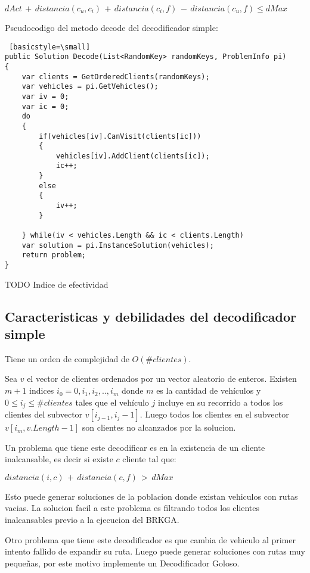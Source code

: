 \bigskip

\( dAct\, +\, distancia(c_u, c_i)\, +\, distancia(c_i, f)\, -\, distancia(c_u, f) \leq dMax\)

\bigskip

Pseudocodigo del metodo decode del decodificador simple:

\bigskip

\begin{lstlisting} [basicstyle=\small]
public Solution Decode(List<RandomKey> randomKeys, ProblemInfo pi)
{
	var clients = GetOrderedClients(randomKeys);
	var vehicles = pi.GetVehicles();	
	var iv = 0;
	var ic = 0;	
	do
	{
		if(vehicles[iv].CanVisit(clients[ic]))
		{
			vehicles[iv].AddClient(clients[ic]);
			ic++;
		}
		else
		{
			iv++;			
		}
		
	} while(iv < vehicles.Length && ic < clients.Length)	
	var solution = pi.InstanceSolution(vehicles);
	return problem;
}
\end{lstlisting}

TODO Indice de efectividad

\subsection{Caracteristicas y debilidades del decodificador simple}

Tiene un orden de complejidad de $O(\#clientes)$.

\bigskip

Sea $v$ el vector de clientes ordenados por un vector aleatorio de enteros. Existen $m+1$ indices $i_0 = 0, i_1, i_2, .., i_m$ donde $m$ es la cantidad de vehículos y $0 \leq i_j \leq \#clientes$ tales que el vehículo $j$ incluye en su recorrido a todos los clientes del subvector $v[i_{j-1}, i_j-1]$. Luego todos los clientes en el subvector $v[i_m, v.Length - 1]$ son clientes no alcanzados por la solucion.

\bigskip

Un problema que tiene este decodificar es en la existencia de un cliente inalcansable, es decir si existe $c$ cliente tal que:

\( distancia(i, c)\, +\, distancia(c, f)\, >\, dMax\)

Esto puede generar soluciones de la poblacion donde existan vehiculos con rutas vacias. La solucion facil a este problema es filtrando todos los clientes inalcansables previo a la ejecucion del BRKGA.

\bigskip

Otro problema que tiene este decodificador es que cambia de vehiculo al primer intento fallido de expandir su ruta. Luego puede generar soluciones con rutas muy pequeñas, por este motivo implemente un Decodificador Goloso.

